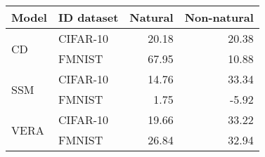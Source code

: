 \begin{tabular}{llrr}
\toprule
 Model    & ID dataset &  Natural &  Non-natural \\
\midrule
\multirow{2}{*}{CD} & CIFAR-10 &    20.18 &        20.38 \\
     & FMNIST &    67.95 &        10.88 \\
\midrule
\multirow{2}{*}{SSM} & CIFAR-10 &    14.76 &        33.34 \\
     & FMNIST &     1.75 &        -5.92 \\
\midrule
\multirow{2}{*}{VERA} & CIFAR-10 &    19.66 &        33.22 \\
     & FMNIST &    26.84 &        32.94 \\
\bottomrule
\end{tabular}
